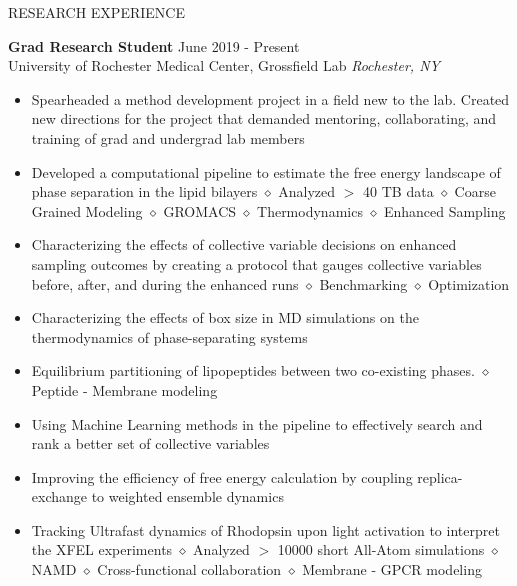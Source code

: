 \documentclass{resume} %
\begin{document}

\begin{rSection}{RESEARCH EXPERIENCE}

\textbf{Grad Research Student} \hfill June 2019 - Present\\
University of Rochester Medical Center, Grossfield Lab \hfill \textit{Rochester, NY}
 \begin{itemize}
    \itemsep -3pt {}
    \item Spearheaded a method development project in a field new to the lab. Created new directions for the project that demanded mentoring, collaborating, and training of grad and undergrad lab members
     \item Developed a computational pipeline to estimate the free energy landscape of phase separation in the lipid bilayers $\diamond$ Analyzed $>$ 40 TB data
     $\diamond$ Coarse Grained Modeling $\diamond$ GROMACS  $\diamond$ Thermodynamics $\diamond$ Enhanced Sampling
     \item Characterizing the effects of collective variable decisions on enhanced sampling outcomes by creating a protocol that gauges collective variables before, after, and during the enhanced runs
     $\diamond$ Benchmarking $\diamond$ Optimization   
    \item Characterizing the effects of box size in MD simulations on the thermodynamics of phase-separating systems
    \item Equilibrium partitioning of lipopeptides between two co-existing phases. $\diamond$ Peptide - Membrane modeling
    \item Using Machine Learning methods in the pipeline to effectively search and rank a better set of collective variables
    \item Improving the efficiency of free energy calculation by coupling replica-exchange to weighted ensemble dynamics
    \item Tracking Ultrafast dynamics of Rhodopsin upon light activation to interpret the XFEL experiments $\diamond$ Analyzed $>$ 10000 short All-Atom simulations
    $\diamond$ NAMD $\diamond$ Cross-functional collaboration $\diamond$  Membrane - GPCR modeling
 \end{itemize}
 

\end{rSection}
\end{document}

